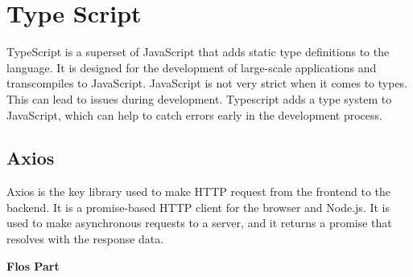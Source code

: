 \section{Type Script}
TypeScript is a superset of JavaScript that adds static type definitions to the language. It is designed for the development of large-scale applications and transcompiles to JavaScript.
JavaScript is not very strict when it comes to types. This can lead to issues during development. Typescript adds a type system to JavaScript, which can help to catch errors early in the development process. 

\cite{Typescript_w3}
\subsection{Axios}
Axios is the key library used to make HTTP request from the frontend to the backend. It is a promise-based HTTP client for the browser and Node.js. It is used to make asynchronous requests to a server, and it returns a promise that resolves with the response data. 

\cite{axios_docs}

\textbf{Flos Part}
